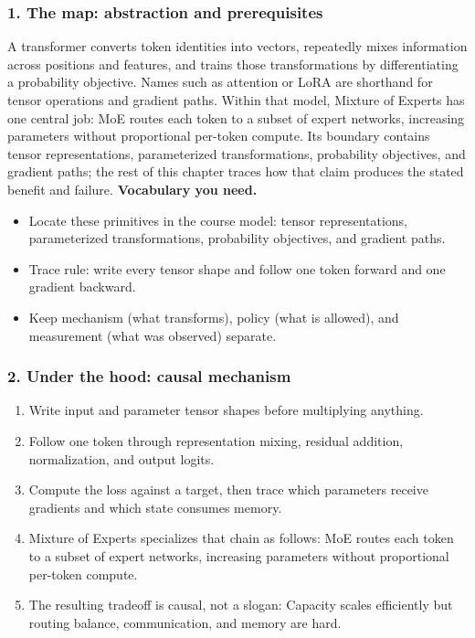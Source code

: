 \subsubsection*{1. The map: abstraction and prerequisites}
A transformer converts token identities into vectors, repeatedly mixes information across positions and features, and trains those transformations by differentiating a probability objective. Names such as attention or LoRA are shorthand for tensor operations and gradient paths.
Within that model, Mixture of Experts has one central job: MoE routes each token to a subset of expert networks, increasing parameters without proportional per-token compute. Its boundary contains tensor representations, parameterized transformations, probability objectives, and gradient paths; the rest of this chapter traces how that claim produces the stated benefit and failure.
\textbf{Vocabulary you need.}\begin{itemize}
\item Locate these primitives in the course model: tensor representations, parameterized transformations, probability objectives, and gradient paths.
\item Trace rule: write every tensor shape and follow one token forward and one gradient backward.
\item Keep mechanism (what transforms), policy (what is allowed), and measurement (what was observed) separate.
\end{itemize}
\subsubsection*{2. Under the hood: causal mechanism}\begin{enumerate}
\item Write input and parameter tensor shapes before multiplying anything.
\item Follow one token through representation mixing, residual addition, normalization, and output logits.
\item Compute the loss against a target, then trace which parameters receive gradients and which state consumes memory.
\item Mixture of Experts specializes that chain as follows: MoE routes each token to a subset of expert networks, increasing parameters without proportional per-token compute.
\item The resulting tradeoff is causal, not a slogan: Capacity scales efficiently but routing balance, communication, and memory are hard.
\end{enumerate}
